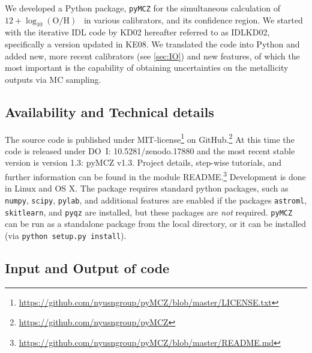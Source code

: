 \documentclass{emulateapj}
\newcommand{\oxabinline}{\ensuremath{12 + \log_{10}(\mathrm{O}/\mathrm{H})}}
\begin{document}
We developed a Python package, \verb=pyMCZ= for the simultaneous
calculation of \oxabinline~ in various calibrators, and its confidence
region.  We started with the iterative IDL code by KD02 hereafter
referred to as IDLKD02, specifically a version updated in KE08. We
translated the code into Python and added new, more recent calibrators
(see \autoref{sec:IO}) and new features, of which the most important
is the capability of obtaining uncertainties on the metallicity
outputs via MC sampling.



\subsection{Availability and Technical details}
The source code is published under
MIT-license\footnote{\url{https://github.com/nyusngroup/pyMCZ/blob/master/LICENSE.txt}}
on GitHub.\footnote{\url{https://github.com/nyusngroup/pyMCZ}} At this
time the code is released under DO~I: 10.5281/zenodo.17880 and the
most recent stable version is version 1.3: {\b pyMCZ v1.3}. Project
details, step-wise tutorials, and further information can be found in
the module
README.\footnote{\url{https://github.com/nyusngroup/pyMCZ/blob/master/README.md}}
Development is done in Linux and OS X. The package requires standard
python packages, such as \verb=numpy=, \verb=scipy=, \verb=pylab=, and
additional features are enabled if the packages \verb=astroml=,
\verb=skitlearn=, and \verb=pyqz= are installed, but these packages
are \emph{not} required.  \verb=pyMCZ= can be
run as a standalone package from the local directory, or it can be
installed (via \verb=python setup.py install=).


\subsection{Input and Output of code}\label{sec:IO}
\end{document}
